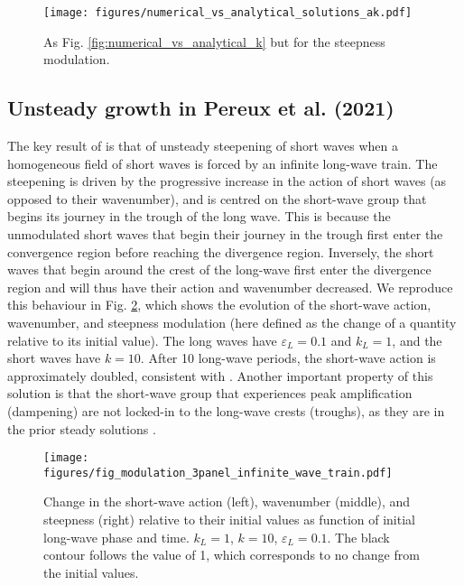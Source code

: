 \documentclass[lineno]{jfm}
\begin{document}
\begin{figure}
\centering
\texttt{[image: figures/numerical\_vs\_analytical\_solutions\_ak.pdf]}
\caption{
  As Fig. \ref{fig:numerical_vs_analytical_k} but for the steepness modulation.
}
\label{fig:numerical_vs_analytical_ak}
\end{figure}

\subsection{Unsteady growth in Pereux et al. (2021)}
\label{subsection:unsteady_growth}

The key result of \citet{peureux2021unsteady} is that of unsteady steepening of
short waves when a homogeneous field of short waves is forced by an infinite
long-wave train.
The steepening is driven by the progressive increase in the action of short
waves (as opposed to their wavenumber), and is centred on the short-wave group
that begins its journey in the trough of the long wave.
This is because the unmodulated short waves that begin their journey in the
trough first enter the convergence region before reaching the divergence region.
Inversely, the short waves that begin around the crest of the long-wave first
enter the divergence region and will thus have their action and wavenumber
decreased.
We reproduce this behaviour in Fig. \ref{fig:modulation_3panel_infinite}, which
shows the evolution of the short-wave action, wavenumber, and steepness
modulation (here defined as the change of a quantity relative to its initial value).
The long waves have $\varepsilon_L = 0.1$ and $k_L = 1$, and the short waves
have $k = 10$.
After 10 long-wave periods, the short-wave action is approximately doubled,
consistent with \citet{peureux2021unsteady}.
Another important property of this solution is that the short-wave group that
experiences peak amplification (dampening) are not locked-in to the long-wave
crests (troughs), as they are in the prior steady solutions
\citep{longuet1960changes,longuet1987propagation,zhang1990evolution}.

\begin{figure}
\centering
\texttt{[image: figures/fig\_modulation\_3panel\_infinite\_wave\_train.pdf]}
\caption{
  Change in the short-wave action (left), wavenumber (middle), and steepness (right)
  relative to their initial values as function of initial long-wave phase and time.
  $k_L = 1$, $k = 10$, $\varepsilon_L = 0.1$.
  The black contour follows the value of 1, which corresponds to no change
  from the initial values.
}
\label{fig:modulation_3panel_infinite}
\end{figure}
\end{document}
